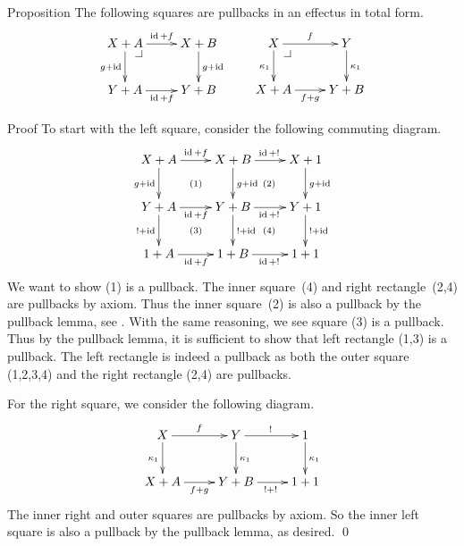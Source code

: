 \documentclass[b]{subfiles}
\begin{document}
\begin{parsec}%
\begin{point}{Proposition}%
The following squares are pullbacks in an effectus in total form.
\begin{equation*}
    \xymatrix{
        X+A \pullback \ar[r]^{\id+f} \ar[d]_{g + \id}
        & X+B \ar[d]^{g+\id}
        \\ Y+A \ar[r]_{\id+f}
        & Y+B
    } \qquad
    \xymatrix{
        X \pullback \ar[d]_{\kappa_1} \ar[r]^{f}
        & Y \ar[d]^{\kappa_1}
        \\
        X+A \ar[r]_{f+g}
        & Y+B
    }
\end{equation*}
\begin{point}{Proof}%
To start with the left square, consider the following commuting diagram.
\begin{equation*}
    \xymatrix{
        X+A \ar@{}[rd]|{(1)} \ar[r]^{\id+f} \ar[d]_{g + \id}
        & X+B \ar@{}[rd]|{(2)} \ar[d]^{g+\id} \ar[r]^{\id+!}
        & X+1 \ar[d]^{g+\id}
        \\ Y+A \ar@{}[rd]|{(3)} \ar[r]_{\id+f} \ar[d]_{!+\id}
        & Y+B \ar@{}[rd]|{(4)} \ar[r]_{\id+!} \ar[d]^{!+\id}
        & Y+1 \ar[d]^{!+\id}
        \\ 1+A \ar[r]_{\id+f}
        & 1+B \ar[r]_{\id+!}
        & 1+1
    }
\end{equation*}
We want to show (1) is a pullback.
The inner square~(4) and right rectangle~(2,4) are pullbacks by axiom.
Thus the inner square~(2) is also a pullback
    by the pullback lemma, see .
With the same reasoning, we see square (3) is a pullback.
Thus by the pullback lemma, it is sufficient to show that
    left rectangle (1,3) is a pullback.
The left rectangle is indeed a pullback
as both the outer square (1,2,3,4)
    and the right rectangle (2,4) are pullbacks.

For the right square, we consider the following diagram.
\begin{equation*}
    \xymatrix{
         X \ar[r]^f \ar[d]_{\kappa_1}
        & Y \ar[r]^{!} \ar[d]^{\kappa_1}
        &1 \ar[d]^{\kappa_1}
        \\ X+A \ar[r]_{f+g}
        & Y+B \ar[r]_{!+!}
        & 1+1
    }
\end{equation*}
The inner right and outer squares are pullbacks by axiom.
So the inner left square is also a pullback by the pullback lemma, as desired.
    \qed
\end{point}
\end{point}
\end{parsec}
\end{document}
